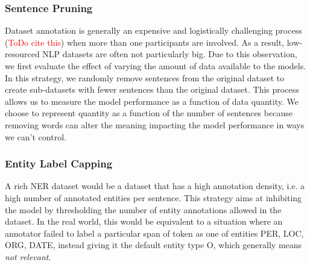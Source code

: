 \documentclass{article}
\newcommand{\mike}[1]{\textcolor{red}{#1}}
\begin{document}
\subsubsection{Sentence Pruning}
\label{sec:method:pruning}

Dataset annotation is generally an expensive and logistically challenging process (\mike{ToDo cite this}) when more than one participants are involved. As a result, low-resourced NLP datasets are often not particularly big. Due to this observation, we first evaluate the effect of varying the amount of data available to the models. In this strategy, we randomly remove sentences from the original dataset to create sub-datasets with fewer sentences than the original dataset. This process allows us to measure the model performance as a function of data quantity. We choose to represent quantity as a function of the number of sentences because removing words can alter the meaning impacting the model performance in ways we can't control.


\subsubsection{Entity Label Capping}
\label{sec:method:cap}

A rich NER dataset would be a dataset that has a high annotation density, i.e. a high number of annotated entities per sentence.
This strategy aims at inhibiting the model by thresholding the number of entity annotations allowed in the dataset. In the real world, this would be equivalent to a situation where an annotator failed to label a particular span of token as one of entities PER, LOC, ORG, DATE, instead giving it the default entity type O, which generally means \textit{not relevant}.
\end{document}
